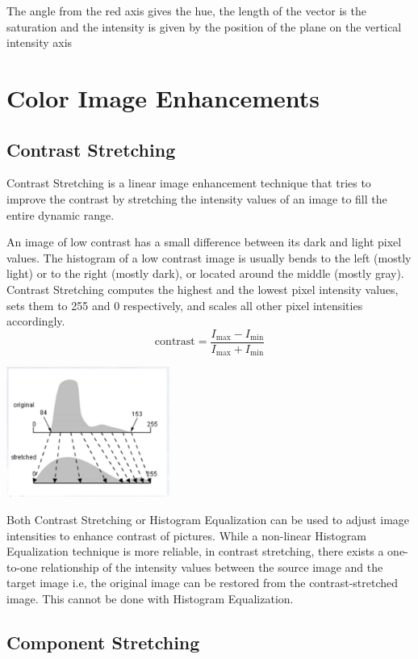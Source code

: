 \documentclass[a4paper,12pt]{article}
\begin{document}
The angle from the red axis gives the hue, the length of the vector is the
saturation and the intensity is given by the position of the plane on the
vertical intensity axis

\section{Color Image Enhancements}
\subsection{Contrast Stretching}
Contrast Stretching is a linear image enhancement technique that tries to
improve the contrast by stretching the intensity values of an image to fill the
entire dynamic range.

An image of low contrast has a small difference between its dark and light
pixel values.  The histogram of a low contrast image is usually bends to the
left (mostly light) or to the right (mostly dark), or located around the middle
(mostly gray).  Contrast Stretching computes the highest and the lowest pixel
intensity values, sets them to 255 and 0 respectively, and scales all other
pixel intensities accordingly.
\[\mathrm{contrast} = \frac{I_\mathrm{max}-I_\mathrm{min}}
                           {I_\mathrm{max}+I_\mathrm{min}}\]

\begin{center}
  \includegraphics[width = 0.40\textwidth]{contrast-mapping.png}
\end{center}

Both Contrast Stretching or Histogram Equalization can be used to adjust image
intensities to enhance contrast of pictures.  While a non-linear Histogram
Equalization technique is more reliable, in contrast stretching, there exists a
one-to-one relationship of the intensity values between the source image and
the target image i.e, the original image can be restored from the
contrast-stretched image.  This cannot be done with Histogram Equalization.

\subsection{Component Stretching}
\end{document}
